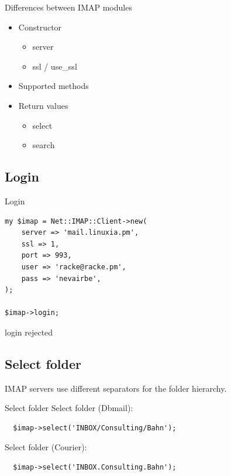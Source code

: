 \begin{frame}[fragile]{Differences between IMAP modules}
  \begin{itemize}
  \item Constructor
    \begin{itemize}
      \item server
      \item ssl / use\_ssl
    \end{itemize}
  \item Supported methods
  \item Return values
    \begin{itemize}
    \item select
      \item search
    \end{itemize}
  \end{itemize}
\end{frame}

\subsection{Login}

\begin{frame}[fragile]{Login}
\begin{verbatim}
my $imap = Net::IMAP::Client->new(
    server => 'mail.linuxia.pm',
    ssl => 1,
    port => 993,
    user => 'racke@racke.pm',
    pass => 'nevairbe',
);

$imap->login;
\end{verbatim}
\end{frame}

login rejected

\subsection{Select folder}

IMAP servers use different separators for the folder hierarchy.

\begin{frame}[fragile]{Select folder}
  Select folder (Dbmail):

\begin{verbatim}
  $imap->select('INBOX/Consulting/Bahn');
\end{verbatim}

  Select folder (Courier):

\begin{verbatim}
  $imap->select('INBOX.Consulting.Bahn');
\end{verbatim}

\end{frame}


